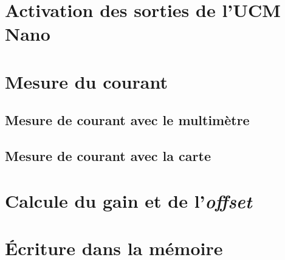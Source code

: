 \section{Activation des sorties de l'UCM Nano}


\section{Mesure du courant}

\subsection{Mesure de courant avec le multimètre}



\subsection{Mesure de courant avec la carte}



\section{Calcule du gain et de l'\textit{offset}}





\section{Écriture dans la mémoire}



